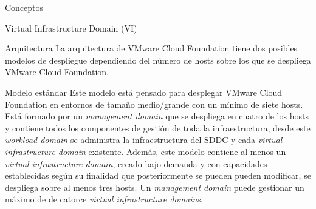 \begin{section}{Conceptos}
\begin{subsubsection}{Virtual Infrastructure Domain (VI)}


 \end{subsubsection}





\begin{subsection}{Arquitectura}
La arquitectura de VMware Cloud Foundation tiene dos posibles modelos de despliegue dependiendo del número de hosts sobre los que se despliega VMware Cloud Foundation.
\begin{subsubsection}{Modelo estándar}
Este modelo está pensado para desplegar VMware Cloud Foundation en entornos de tamaño medio/grande con un mínimo de siete hosts. Está formado por un \textit{management domain} que se despliega en cuatro de los hosts y contiene todos los componentes de gestión de toda la infraestructura, desde este \textit{workload domain} se administra la infraestructura del SDDC y cada \textit{virtual infrastructure domain} existente. Además, este modelo contiene al menos un \textit{virtual infrastructure domain}, creado bajo demanda y con capacidades establecidas según su finalidad que posteriormente se pueden pueden modificar, se despliega sobre al menos tres hosts. Un \textit{management domain} puede gestionar un máximo de de catorce \textit{virtual infrastructure domains}.


\end{subsubsection}
\end{subsection}
\end{section}
